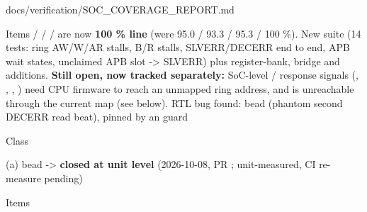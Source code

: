 \begin{relocated}{docs/verification/SOC_COVERAGE_REPORT.md}
\begin{rowtable}
\begin{rowcell}{Items}
 /  /
 /  are now \textbf{100 \%
line} (were 95.0 / 93.3 / 95.3 / 100 \%). New suite
 (14 tests: ring AW/W/AR stalls, B/R stalls,
SLVERR/\allowbreak{}DECERR end to end, APB wait states, unclaimed APB
slot -\textgreater{} SLVERR) plus register-bank, bridge and
 additions. \textbf{Still open, now tracked
separately:} SoC-level / response signals
(, , ,
) need CPU firmware to reach an unmapped ring address, and
 is unreachable through the current map (see below).
RTL bug found: bead  (phantom second DECERR read beat),
pinned by an  guard

\end{rowcell}


\begin{rowcell}{Class}

(a) bead  -\textgreater{} \textbf{closed at unit level}
(2026-10-08, PR ; unit-measured, CI
re-measure pending)

\end{rowcell}

\begin{rowcell}{Items}


\end{rowcell}
\end{rowtable}
\end{relocated}
